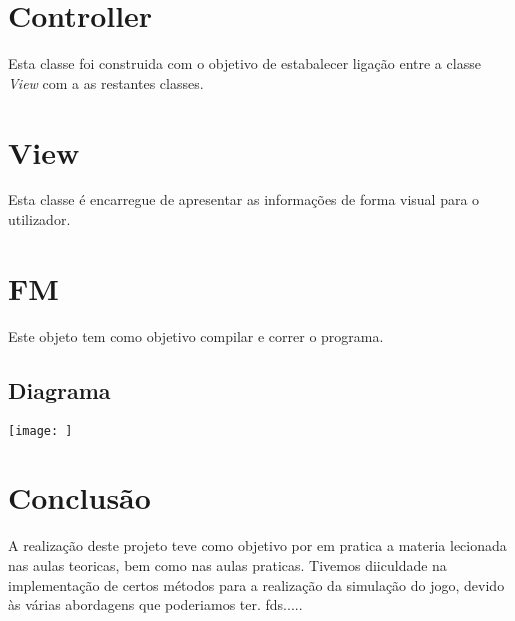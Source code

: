 \documentclass[a4paper,12pt]{article}
\begin{document}
\section{Controller}
    Esta classe foi construida com o objetivo de estabalecer ligação entre a classe \emph{View} com a as restantes
classes.

\section{View}
    Esta classe é encarregue de apresentar as informações de forma visual para o utilizador.

\section{FM}
Este objeto tem como objetivo compilar e correr o programa.\par
\subsection{Diagrama}
        \begin{center}
        \vspace*{2cm}
        \texttt{[image: ]}
        \end{center}


\section{Conclusão}
    A realização deste projeto teve como objetivo por em pratica a materia lecionada nas aulas teoricas, bem como nas
aulas praticas. Tivemos diiculdade na implementação de certos métodos para a realização da simulação do jogo, devido às
várias abordagens que poderiamos ter. fds.....
\end{document}
